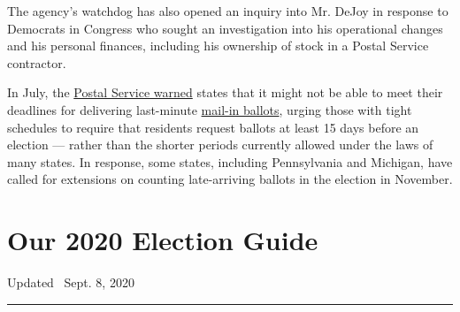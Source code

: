 The agency's watchdog has also opened an inquiry into Mr. DeJoy in
response to Democrats in Congress who sought an investigation into his
operational changes and his personal finances, including his ownership
of stock in a Postal Service contractor.

In July, the
\href{https://www.nytimes3xbfgragh.onion/2020/08/18/us/politics/postal-service-suspends-changes.html}{Postal
Service warned} states that it might not be able to meet their deadlines
for delivering last-minute
\href{https://www.nytimes3xbfgragh.onion/2020/08/26/us/politics/mail-in-voting-foreign-intervention.html}{mail-in
ballots}, urging those with tight schedules to require that residents
request ballots at least 15 days before an election --- rather than the
shorter periods currently allowed under the laws of many states. In
response, some states, including Pennsylvania and Michigan, have called
for extensions on counting late-arriving ballots in the election in
November.

\hypertarget{our-2020-election-guide}{%
\section{Our 2020 Election Guide}\label{our-2020-election-guide}}

Updated ~Sept. 8, 2020

\begin{center}\rule{0.5\linewidth}{\linethickness}\end{center}

